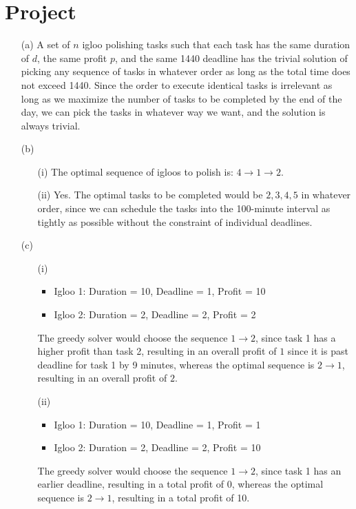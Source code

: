 \documentclass[11pt]{article}
\theoremstyle{definition}
\theoremstyle{remark}
\begin{document}
\section{Project}
\begin{enumerate}
\item[(a)] A set of $n$ igloo polishing tasks such that each task has the same duration of $d$, the same profit $p$, and the same 1440 deadline has the trivial solution of picking any sequence of tasks in whatever order as long as the total time does not exceed 1440. Since the order to execute identical tasks is irrelevant as long as we maximize the number of tasks to be completed by the end of the day, we can pick the tasks in whatever way we want, and the solution is always trivial.

\item[(b)]
\begin{enumerate}
\item[(i)] The optimal sequence of igloos to polish is: $4\to1\to2$.
\item[(ii)] Yes. The optimal tasks to be completed would be $2,3,4,5$ in whatever order, since we can schedule the tasks into the 100-minute interval as tightly as possible without the constraint of individual deadlines.
\end{enumerate}

\item[(c)]
\begin{enumerate}
\item[(i)]
\begin{itemize}
\item Igloo 1: Duration = 10, Deadline = 1, Profit = 10
\item Igloo 2: Duration = 2, Deadline = 2, Profit = 2
\end{itemize}

The greedy solver would choose the sequence $1 \to 2$, since task 1 has a higher profit than task 2, resulting in an overall profit of $1$ since it is past deadline for task 1 by 9 minutes, whereas the optimal sequence is $2 \to 1$, resulting in an overall profit of $2$.

\item[(ii)]
\begin{itemize}
\item Igloo 1: Duration = 10, Deadline = 1, Profit = 1
\item Igloo 2: Duration = 2, Deadline = 2, Profit = 10
\end{itemize}

The greedy solver would choose the sequence $1\to 2$, since task 1 has an earlier deadline, resulting in a total profit of 0, whereas the optimal sequence is $2 \to 1$, resulting in a total profit of 10.
\end{enumerate}
\end{enumerate}
\end{document}
